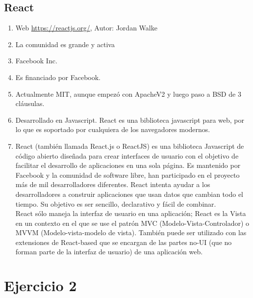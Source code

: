 \subsection{React}
\begin{enumerate}
    \item Web \url{https://reactjs.org/}, Autor: Jordan Walke
    \item La comunidad es grande y activa
    \item Facebook Inc.
    \item Es financiado por Facebook.
    \item Actualmente MIT, aunque empezó con ApacheV2 y luego paso a BSD de 3 cláusulas.
    \item Desarrollado en Javascript. React es una biblioteca javascript para web, por lo que es soportado por cualquiera de los navegadores modernos.
    \item React (también llamada React.js o ReactJS) es una biblioteca Javascript de código abierto diseñada para crear interfaces de usuario con el objetivo de facilitar el desarrollo de aplicaciones en una sola página. Es mantenido por Facebook y la comunidad de software libre, han participado en el proyecto más de mil desarrolladores diferentes. React intenta ayudar a los desarrolladores a construir aplicaciones que usan datos que cambian todo el tiempo. Su objetivo es ser sencillo, declarativo y fácil de combinar.\\React sólo maneja la interfaz de usuario en una aplicación; React es la Vista en un contexto en el que se use el patrón MVC (Modelo-Vista-Controlador) o MVVM (Modelo-vista-modelo de vista). También puede ser utilizado con las extensiones de React-based que se encargan de las partes no-UI (que no forman parte de la interfaz de usuario) de una aplicación web.
\end{enumerate}

\clearpage
\section{Ejercicio 2}

